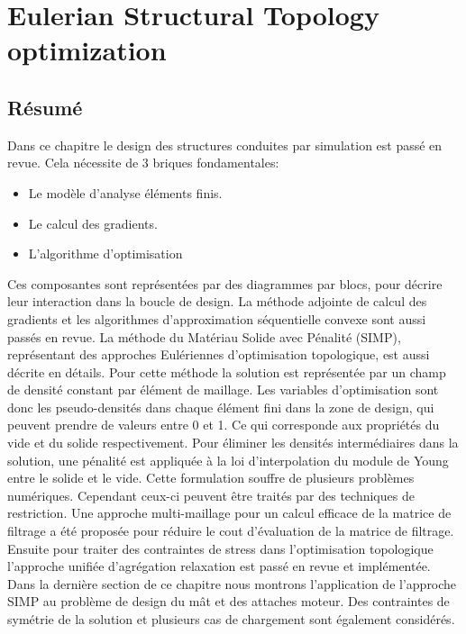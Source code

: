 \chapter{Eulerian Structural Topology optimization}
\label{chap:2}
\minitoc
\begin{mdframed}[hidealllines=true,backgroundcolor=lightgray!20]
\section*{Résumé}
Dans ce chapitre le design des structures conduites par simulation est passé en revue. Cela nécessite de 3 briques fondamentales: 
\begin{itemize}
\item Le modèle d'analyse éléments finis.
\item Le calcul des gradients.
\item L'algorithme d'optimisation
\end{itemize} 
Ces composantes sont représentées par des diagrammes par blocs, pour décrire leur interaction dans la boucle de design. La méthode adjointe de calcul des gradients et les algorithmes d'approximation séquentielle convexe sont aussi passés en revue.
La méthode du Matériau Solide avec Pénalité (SIMP), représentant des approches Eulériennes d'optimisation topologique, est aussi décrite en détails. Pour cette méthode la solution est représentée par un champ de densité constant par élément de maillage. Les variables d'optimisation sont donc les pseudo-densités dans chaque élément fini dans la zone de design, qui peuvent prendre de valeurs entre 0 et 1. Ce qui corresponde aux propriétés du vide et du solide respectivement. Pour éliminer les densités intermédiaires dans la solution, une pénalité est appliquée à la loi d'interpolation du module de Young entre le solide et le vide. Cette formulation souffre de plusieurs problèmes numériques. Cependant ceux-ci peuvent être traités par des techniques de restriction. Une approche multi-maillage pour un calcul efficace de la matrice de filtrage a été proposée pour réduire le cout d'évaluation de la matrice de filtrage. Ensuite pour traiter des contraintes de stress dans l'optimisation topologique l'approche unifiée d'agrégation relaxation \cite{verbart2017unified} est passé en revue et implémentée. Dans la dernière section de ce chapitre nous montrons l'application de l'approche SIMP au problème de design du mât et des attaches moteur. Des contraintes de symétrie de la solution et plusieurs cas de chargement sont également considérés.
\end{mdframed}
